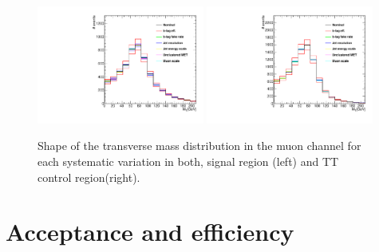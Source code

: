 \begin{figure}[htbp]
	\centering
		\includegraphics[width=0.49\textwidth]{Figures/syst_Wbb_var.pdf}
		\includegraphics[width=0.49\textwidth]{Figures/syst_TT_var.pdf}
	\caption[Shape of the transverse mass distribution for each systematic variation in both, signal region and TT control region.]{Shape of the transverse mass distribution in the muon channel for each systematic variation in both, signal region (left) and TT control region(right).}
	\label{fig:shapeVar}
\end{figure}

\section{Acceptance and efficiency}
\label{sec:AE}
    
